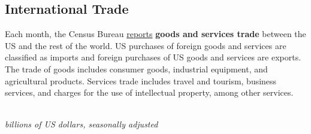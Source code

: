 \begin{minipage}{0.76\textwidth}
\end{minipage}
\newpage


\hypertarget{extt}{\label{extt}}
\subsection*{International Trade}
\begin{minipage}{0.76\textwidth}
\small Each month, the Census Bureau \href{https://www.census.gov/foreign-trade/Press-Release/current\_press\_release/index.html}{reports} \textbf{goods and services trade} between the US and the rest of the world. US purchases of foreign goods and services are classified as imports and foreign purchases of US goods and services are exports. The trade of goods includes consumer goods, industrial equipment, and agricultural products. Services trade includes travel and tourism, business services, and charges for the use of intellectual property, among other services. 
\end{minipage}
\vspace{-1mm}

\begin{minipage}{0.36\textwidth}
\\
\footnotesize{\textit{billions of US dollars, seasonally adjusted}}\\
\end{minipage} \hspace{5mm}
\begin{minipage}{0.36\textwidth}
\small 
\end{minipage}
\vspace{3mm}

